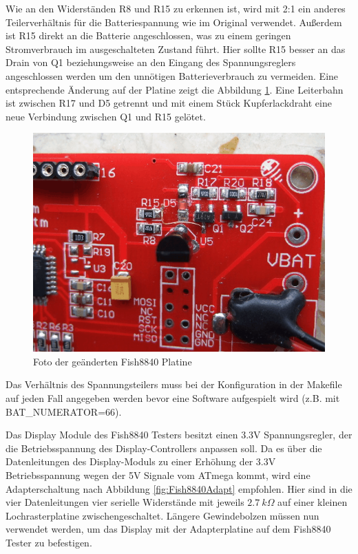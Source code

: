 Wie an den Widerständen R8 und R15 zu erkennen ist, 
wird mit 2:1 ein anderes Teilerverhältnis für die Batteriespannung wie im Original verwendet.
Außerdem ist R15 direkt an die Batterie angeschlossen, was zu einem geringen Stromverbrauch im
ausgeschalteten Zustand führt. Hier sollte R15 besser an das Drain von Q1 beziehungsweise an den
Eingang des Spannungsreglers angeschlossen werden um den unnötigen Batterieverbrauch zu vermeiden.
Eine entsprechende Änderung auf der Platine zeigt die Abbildung \ref{fig:Fish8840patch}.
Eine Leiterbahn ist zwischen R17 und D5 getrennt und mit einem Stück Kupferlackdraht eine
neue Verbindung zwischen Q1 und R15 gelötet.

\begin{figure}[H]
\centering
\includegraphics[width=12cm]{../PNG/Fish8840patch.png}
\caption{Foto der geänderten Fish8840 Platine}
\label{fig:Fish8840patch}
\end{figure}

Das Verhältnis des Spannungsteilers muss bei der Konfiguration in der Makefile auf jeden Fall angegeben
werden bevor eine Software aufgespielt wird (z.B. mit BAT\_NUMERATOR=66).

Das Display Module des Fish8840 Testers besitzt einen 3.3V Spannungsregler, der die Betriebsspannung
des Display-Controllers anpassen soll.
Da es über die Datenleitungen des Display-Moduls zu einer Erhöhung der 3.3V Betriebsspannung wegen
der 5V Signale vom ATmega kommt,
wird eine Adapterschaltung nach Abbildung \ref{fig:Fish8840Adapt} empfohlen. Hier sind in die vier
Datenleitungen vier serielle Widerstände mit jeweils \(2.7~k\Omega\) auf einer kleinen Lochrasterplatine
zwischengeschaltet.
Längere Gewindebolzen müssen nun verwendet werden, um das Display mit der Adapterplatine auf dem
Fish8840 Tester zu befestigen.

